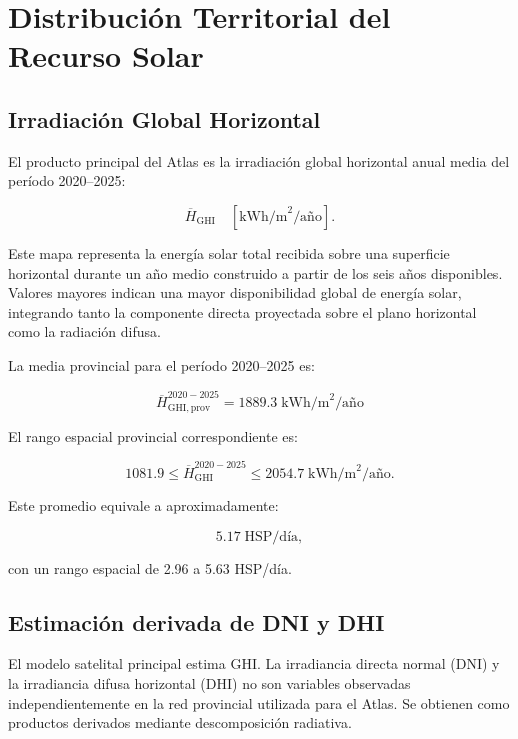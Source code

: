 \documentclass[11pt,a4paper]{article}
\begin{document}

\section{Distribución Territorial del Recurso Solar}

\subsection{Irradiación Global Horizontal}

El producto principal del Atlas es la irradiación global horizontal anual media del período 2020--2025:

\[
\overline{H}_{\mathrm{GHI}}
\quad [\text{kWh/m}^2\text{/año}].
\]

Este mapa representa la energía solar total recibida sobre una superficie horizontal durante un año medio construido a partir de los seis años disponibles. Valores mayores indican una mayor disponibilidad global de energía solar, integrando tanto la componente directa proyectada sobre el plano horizontal como la radiación difusa.

La media provincial para el período 2020--2025 es:

\[
\boxed{
\overline{H}_{\mathrm{GHI,prov}}^{2020-2025}
=
1889.3
\;\text{kWh/m}^2\text{/año}
}
\]

El rango espacial provincial correspondiente es:

\[
1081.9
\leq
\overline{H}_{\mathrm{GHI}}^{2020-2025}
\leq
2054.7
\;\text{kWh/m}^2\text{/año}.
\]

Este promedio equivale a aproximadamente:

\[
5.17\;\text{HSP/día},
\]

con un rango espacial de 2.96 a 5.63 HSP/día.

\subsection{Estimación derivada de DNI y DHI}

El modelo satelital principal estima GHI. La irradiancia directa normal (DNI) y la irradiancia difusa horizontal (DHI) no son variables observadas independientemente en la red provincial utilizada para el Atlas. Se obtienen como productos derivados mediante descomposición radiativa.
\end{document}
